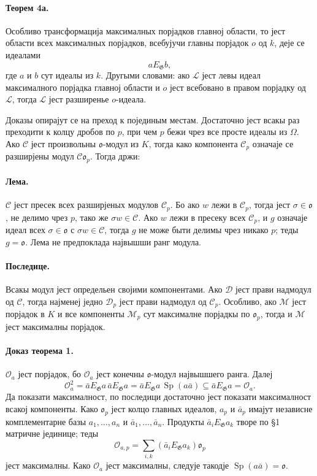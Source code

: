 ﻿\documentclass[11pt]{article}
\providecommand{\Sp}{\operatorname{Sp}}
\providecommand{\Gg}{\mathfrak G}
\providecommand{\oo}{\mathfrak o}
\begin{document}
\paragraph{Теорем 4а.}
Особливо трансформација максималных порјадков главној области, то јест области всех максималных порјадков, всебујучи главны порјадок \(o\) од \(k\), деје се идеалами
\[
        aE_\Gg b,
\]
где \(a\) и \(b\) сут идеалы из \(k\). Другыми словами: ако \(\mathcal L\) јест левы идеал максималного порјадка главној области и \(o\) јест всебовано в правом порјадку од \(\mathcal L\), тогда \(\mathcal L\) јест разширенье \(o\)-идеала.

Доказы опирајут се на преход к појединым местам. Достаточно јест всакы раз преходити к колцу дробов по \(p\), при чем \(p\) бежи чрез все просте идеалы из \(\Omega\). Ако \(\mathcal C\) јест произвольны \(\oo\)-модул из \(K\), тогда како компонента \(\mathcal C_p\) означаје се разширјены модул \(\mathcal C\oo_p\). Тогда држи:

\paragraph{Лема.}
\(\mathcal C\) јест пресек всех разширјеных модулов \(\mathcal C_p\). Бо ако \(w\) лежи в \(\mathcal C_p\), тогда јест \(\sigma\in\oo\), не делимо чрез \(p\), тако же \(\sigma w\in\mathcal C\). Ако \(w\) лежи в пресеку всех \(\mathcal C_p\), и \(g\) означаје идеал всех \(\sigma\in\oo\) с \(\sigma w\in\mathcal C\), тогда \(g\) не може быти делимы чрез никако \(p\); теды \(g=\oo\). Лема не предпоклада највышши ранг модула.

\paragraph{Последице.}
Всакы модул јест определьен својими компонентами. Ако \(\mathcal D\) јест прави надмодул од \(\mathcal C\), тогда најменеј једно \(\mathcal D_p\) јест прави надмодул од \(\mathcal C_p\). Особливо, ако \(\mathcal M\) јест порјадок в \(K\) и все компоненты \(\mathcal M_p\) сут максималне порјадкы по \(\oo_p\), тогда и \(\mathcal M\) јест максималны порјадок.

\paragraph{Доказ теорема 1.}
\(\mathcal O_a\) јест порјадок, бо \(\mathcal O_a\) јест конечны \(\oo\)-модул највышшего ранга. Далеј
\[
        \mathcal O_a^2
        =\bar aE_\Gg a\,\bar aE_\Gg a
        =\bar aE_\Gg a\,\Sp(a\bar a)
        \subseteq \bar aE_\Gg a=\mathcal O_a.
\]
Да показати максималност, по последици достаточно јест показати максималност всакој компоненты. Како \(\oo_p\) јест колцо главных идеалов, \(a_p\) и \(\bar a_p\) имајут независне комплементарне базы \(a_1,\ldots,a_n\) и \(\bar a_1,\ldots,\bar a_n\). Продукты \(\bar a_iE_\Gg a_k\) творе по §1 матричне јединице; теды
\[
        \mathcal O_{a,p}=\sum_{i,k}(\bar a_iE_\Gg a_k)\oo_p
\]
јест максималны. Како \(\mathcal O_a\) јест максималны, следује такодје \(\Sp(a\bar a)=\oo\).
\end{document}

